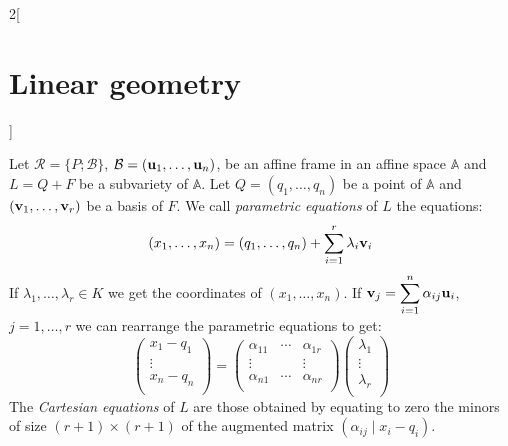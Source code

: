 \documentclass[../../../main_math.tex]{subfiles}
\begin{document}
\begin{multicols}{2}[\section{Linear geometry}]
\begin{definition}
  \end{definition}
  \begin{definition}
    Let $\mathcal{R}=\{P;\mathcal{B}\}$, $\mathcal{B}=(\boldsymbol{\mathrm{u}}_1,\ldots,\boldsymbol{\mathrm{u}}_n)$, be an affine frame in an affine space $\mathbb{A}$ and $L=Q+F$ be a subvariety of $\mathbb{A}$. Let $Q=(q_1,\ldots,q_n)$ be a point of $\mathbb{A}$ and $(\boldsymbol{\mathrm{v}}_1,\ldots,\boldsymbol{\mathrm{v}}_r)$ be a basis of $F$. We call \emph{parametric equations} of $L$ the equations: $$(x_1,\ldots,x_n)=(q_1,\ldots,q_n)+\sum_{i=1}^r\lambda_i\boldsymbol{\mathrm{v}}_i$$ If $\lambda_1,\ldots,\lambda_r\in K$ we get the coordinates of $(x_1,\ldots,x_n)$. If $\displaystyle \boldsymbol{\mathrm{v}}_j=\sum_{i=1}^n\alpha_{ij}\boldsymbol{\mathrm{u}}_i$, $j=1,\ldots,r$ we can rearrange the parametric equations to get: $$\begin{pmatrix}
        x_1-q_1 \\
        \vdots  \\
        x_n-q_n \\
      \end{pmatrix}=\begin{pmatrix}
        \alpha_{11} & \cdots & \alpha_{1r} \\
        \vdots      &        & \vdots      \\
        \alpha_{n1} & \cdots & \alpha_{nr} \\
      \end{pmatrix}\begin{pmatrix}
        \lambda_1 \\
        \vdots    \\
        \lambda_r \\
      \end{pmatrix}$$ The \emph{Cartesian equations} of $L$ are those obtained by equating to zero the minors of size $(r+1)\times(r+1)$ of the augmented matrix $\left(\alpha_{ij}\mid x_i-q_i\right)$.
  \end{definition}

\end{multicols}
\end{document}
